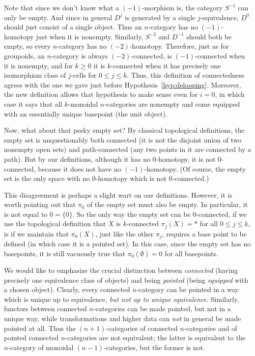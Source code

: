 \documentclass[12pt]{amsart}
\begin{document}
Note that since we don't know what a $(-1)$-morphism is, the category
$S^{-1}$ can only be empty.  And since in general $D^j$ is generated
by a single $j$-equivalence, $D^0$ should just consist of a single
object.  Thus an $n$-category has no $(-1)$-homotopy just when it is
nonempty.  Similarly, $S^{-2}$ and $D^{-1}$ should both be empty, so
every $n$-category has no $(-2)$-homotopy.  Therefore, just as for
groupoids, an $n$-category is always $(-2)$-connected, is
$(-1)$-connected when it is nonempty, and for $k\ge 0$ it is
$k$-connected when it has precisely one isomorphism class of $j$-cells
for $0\le j\le k$.  Thus, this definition of connectedness agrees with
the one we gave just before Hypothesis~\ref{hyp:delooping}.  Moreover,
the new definition allows that hypothesis to make sense even for
$i=0$, in which case it says that all $k$-monoidal $n$-categories are
nonempty and come equipped with an essentially unique basepoint (the
unit object).

Now, what about that pesky empty set?  By classical topological
definitions, the empty set is unquestionably both connected (it is not
the disjoint union of two nonempty open sets) and path-connected (any
two points in it are connected by a path).  But by our definitions,
although it has no $0$-homotopy, it is not $0$-connected, because it
does not have no $(-1)$-homotopy.  (Of course, the empty set is the
only space with no $0$-homotopy which is not $0$-connected.)

This disagreement is perhaps a slight wart on our definitions.
However, it is worth pointing out that $\pi_0$ of the empty set must
also be empty.  In particular, it is not equal to $0=\{0\}$.  So the
only way the empty set can be $0$-connected, if we use the topological
definition that $X$ is $k$-connected $\pi_j(X)=*$ for all $0\le j\le
k$, is if we maintain that $\pi_0(X)$, just like the other $\pi_j$,
requires a base point to be defined (in which case it is a pointed
set).  In this case, since the empty set has no basepoints, it is
still vacuously true that $\pi_0(\emptyset)=0$ for all basepoints.

We would like to emphasize the crucial distinction between
\emph{connected} (having precisely one equivalence class of objects)
and being \emph{pointed} (being \emph{equipped} with a chosen object).
Clearly, every connected $n$-category can be pointed in a way which is
unique up to equivalence, \emph{but not up to unique equivalence}.
Similarly, functors between connected $n$-categories can be made
pointed, but not in a unique way, while transformations and higher
data can \emph{not} in general be made pointed at all.  Thus the
$(n+1)$-categories of connected $n$-categories and of pointed
connected $n$-categories are not equivalent; the latter is equivalent
to the $n$-category of monoidal $(n-1)$-categories, but the former is
not.
\end{document}
